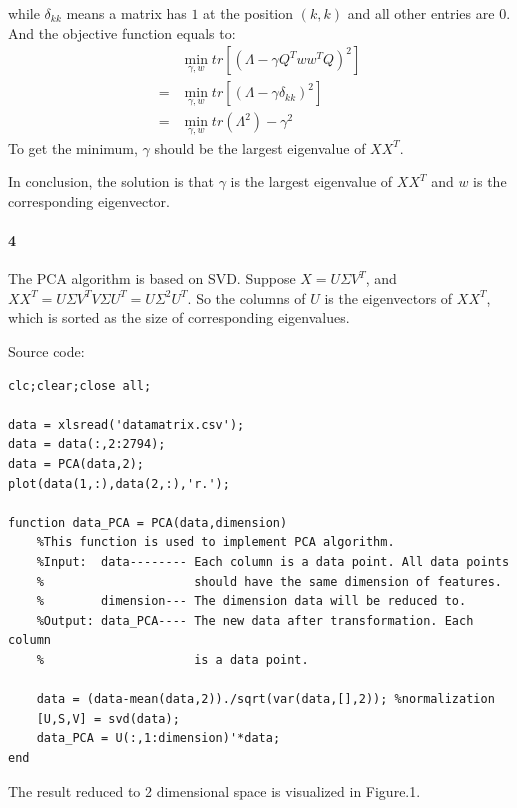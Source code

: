 \documentclass[22pt]{article}
\begin{document}
	while $\delta_{kk}$ means a matrix has $1$ at the position $(k,k)$ and all other entries are $0$. And the objective function equals to:
	\begin{align}
		& \min_{\gamma,w} tr[(\Lambda -	\gamma Q^T ww^TQ)^2]\\
		= & \min_{\gamma,w} tr[(\Lambda -	\gamma \delta_{kk})^2]\\
		= & \min_{\gamma,w} tr(\Lambda^2) - \gamma^2
	\end{align}
	 To get the minimum, $\gamma$ should be the largest eigenvalue of $XX^T$. 

	In conclusion, the solution is that $\gamma$ is the largest eigenvalue of $XX^T$ and $w$ is the corresponding eigenvector.

	\paragraph{4} The PCA algorithm is based on SVD. Suppose $X = U \Sigma V^T$, and $XX^T = U \Sigma V^T V \Sigma U^T= U \Sigma^2 U^T$. So the columns of $U$ is the eigenvectors of $XX^T$, which is sorted as the size of corresponding eigenvalues.

	Source code:
	\begin{lstlisting}
clc;clear;close all;

data = xlsread('datamatrix.csv');
data = data(:,2:2794);
data = PCA(data,2);
plot(data(1,:),data(2,:),'r.');

function data_PCA = PCA(data,dimension)
    %This function is used to implement PCA algorithm.
    %Input:  data-------- Each column is a data point. All data points
    %                     should have the same dimension of features.
    %        dimension--- The dimension data will be reduced to.
    %Output: data_PCA---- The new data after transformation. Each column
    %                     is a data point.
    
    data = (data-mean(data,2))./sqrt(var(data,[],2)); %normalization
    [U,S,V] = svd(data);
    data_PCA = U(:,1:dimension)'*data;
end
	\end{lstlisting}

	The result reduced to 2 dimensional space is visualized in Figure.1.
\end{document}
